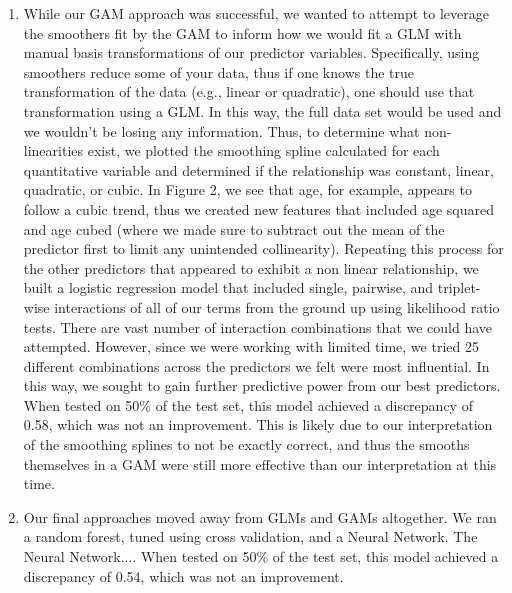 \documentclass[11pt, oneside]{article}   	%
\begin{document}
\begin{enumerate}
  \item
  While our GAM approach was successful, we wanted to attempt to leverage the smoothers fit by the GAM to inform how we would fit a GLM with manual basis transformations of our predictor variables. Specifically, using smoothers reduce some of your data, thus if one knows the true transformation of the data (e.g., linear or quadratic), one should use that transformation using a GLM. In this way, the full data set would be used and we wouldn't be losing any information. Thus, to determine what non-linearities exist, we plotted the smoothing spline calculated for each quantitative variable and determined if the relationship was constant, linear, quadratic, or cubic. In Figure 2, we see that age, for example, appears to follow a cubic trend, thus we created new features that included age squared and age cubed (where we made sure to subtract out the mean of the predictor first to limit any unintended collinearity). Repeating this process for the other predictors that appeared to exhibit a non linear relationship, we built a logistic regression model that included single, pairwise, and triplet-wise interactions of all of our terms from the ground up using likelihood ratio tests. There are vast number of interaction combinations that we could have attempted. However, since we were working with limited time, we tried 25 different combinations across the predictors we felt were most influential. In this way, we sought to gain further predictive power from our best predictors. When tested on 50\% of the test set, this model achieved a discrepancy of 0.58, which was not an improvement. This is likely due to our interpretation of the smoothing splines to not be exactly correct, and thus the smooths themselves in a GAM were still more effective than our interpretation at this time.
  
    \item
  Our final approaches moved away from GLMs and GAMs altogether. We ran a random forest, tuned using cross validation, and a Neural Network. The Neural Network.... When tested on 50\% of the test set, this model achieved a discrepancy of 0.54, which was not an improvement. 
  
  
\end{enumerate}
  \FloatBarrier
\end{document}
